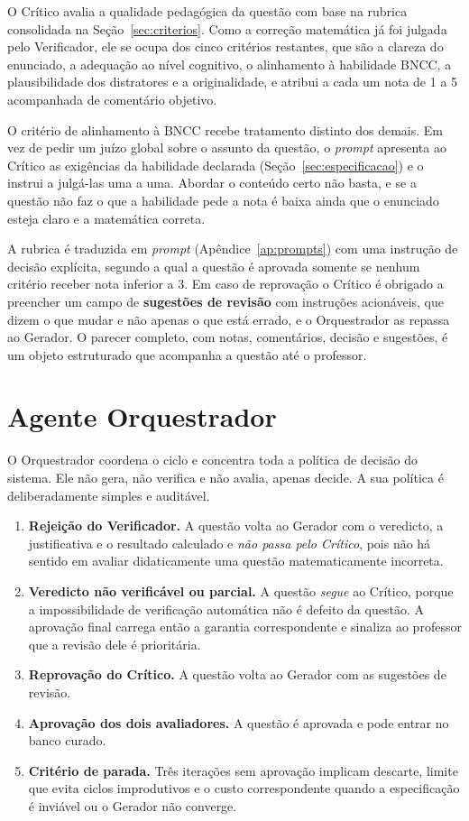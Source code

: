 O Crítico avalia a qualidade pedagógica da questão com base na rubrica consolidada na
Seção~\ref{sec:criterios}. Como a correção matemática já foi julgada pelo Verificador, ele se
ocupa dos cinco critérios restantes, que são a clareza do enunciado, a adequação ao nível
cognitivo, o alinhamento à habilidade BNCC, a plausibilidade dos distratores e a originalidade, e
atribui a cada um nota de 1 a 5 acompanhada de comentário objetivo.

O critério de alinhamento à BNCC recebe tratamento distinto dos demais. Em vez de pedir um juízo
global sobre o assunto da questão, o \emph{prompt} apresenta ao Crítico as exigências da habilidade
declarada (Seção~\ref{sec:especificacao}) e o instrui a julgá-las uma a uma. Abordar o conteúdo
certo não basta, e se a questão não faz o que a habilidade pede a nota é baixa ainda que o
enunciado esteja claro e a matemática correta.

A rubrica é traduzida em \emph{prompt} (Apêndice~\ref{ap:prompts}) com uma instrução de decisão
explícita, segundo a qual a questão é aprovada somente se nenhum critério receber nota inferior a
3. Em caso de reprovação o Crítico é obrigado a preencher um campo de \textbf{sugestões de revisão}
com instruções acionáveis, que dizem o que mudar e não apenas o que está errado, e o Orquestrador
as repassa ao Gerador. O parecer completo, com notas, comentários, decisão e sugestões, é um
objeto estruturado que acompanha a questão até o professor.

\section{Agente Orquestrador}
\label{sec:ag-orquestrador}

O Orquestrador coordena o ciclo e concentra toda a política de decisão do sistema. Ele não gera,
não verifica e não avalia, apenas decide. A sua política é deliberadamente simples e auditável.

\begin{enumerate}
\item \textbf{Rejeição do Verificador.} A questão volta ao Gerador com o veredicto, a justificativa
  e o resultado calculado e \emph{não passa pelo Crítico}, pois não há sentido em avaliar
  didaticamente uma questão matematicamente incorreta.
\item \textbf{Veredicto não verificável ou parcial.} A questão \emph{segue} ao Crítico, porque a
  impossibilidade de verificação automática não é defeito da questão. A aprovação final carrega
  então a garantia correspondente e sinaliza ao professor que a revisão dele é prioritária.
\item \textbf{Reprovação do Crítico.} A questão volta ao Gerador com as sugestões de revisão.
\item \textbf{Aprovação dos dois avaliadores.} A questão é aprovada e pode entrar no banco curado.
\item \textbf{Critério de parada.} Três iterações sem aprovação implicam descarte, limite que evita
  ciclos improdutivos e o custo correspondente quando a especificação é inviável ou o Gerador não
  converge.
\end{enumerate}

